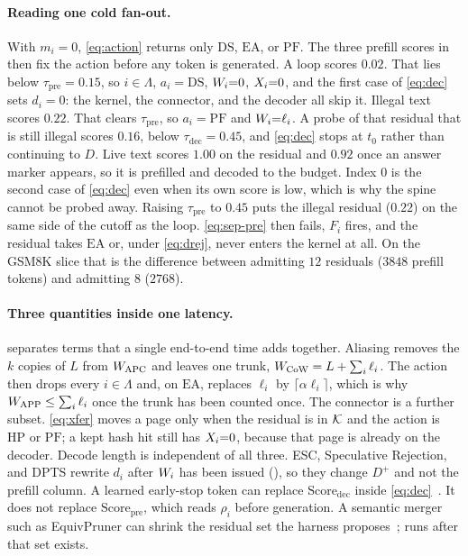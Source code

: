 \paragraph{Reading one cold fan-out.}
With $m_i{=}0$, \eqref{eq:action} returns only $\mathrm{DS}$, $\mathrm{EA}$, or $\mathrm{PF}$.
The three prefill scores in  then fix the action before any token is generated.
A loop scores $0.02$.
That lies below $\tau_{\mathrm{pre}}{=}0.15$, so $i{\in}\Lambda$, $a_i{=}\mathrm{DS}$, $W_i{=}0$, $X_i{=}0$, and the first case of \eqref{eq:dec} sets $d_i{=}0$: the kernel, the connector, and the decoder all skip it.
Illegal text scores $0.22$.
That clears $\tau_{\mathrm{pre}}$, so $a_i{=}\mathrm{PF}$ and $W_i{=}\ell_i$.
A probe of that residual that is still illegal scores $0.16$, below $\tau_{\mathrm{dec}}{=}0.45$, and \eqref{eq:dec} stops at $t_0$ rather than continuing to $D$.
Live text scores $1.00$ on the residual and $0.92$ once an answer marker appears, so it is prefilled and decoded to the budget.
Index $0$ is the second case of \eqref{eq:dec} even when its own score is low, which is why the spine cannot be probed away.
Raising $\tau_{\mathrm{pre}}$ to $0.45$ puts the illegal residual ($0.22$) on the same side of the cutoff as the loop.
\eqref{eq:sep-pre} then fails, $F_i$ fires, and the residual takes $\mathrm{EA}$ or, under \eqref{eq:drej}, never enters the kernel at all.
On the GSM8K slice that is the difference between admitting $12$ residuals ($3848$ prefill tokens) and admitting $8$ ($2768$).

\paragraph{Three quantities inside one latency.}
 separates terms that a single end-to-end time adds together.
Aliasing removes the $k$ copies of $L$ from $W_{\mathrm{APC}}$ and leaves one trunk, $W_{\mathrm{CoW}}=L+\sum_i\ell_i$.
The action then drops every $i{\in}\Lambda$ and, on $\mathrm{EA}$, replaces $\ell_i$ by $\lceil\alpha\ell_i\rceil$, which is why $W_{\mathrm{APP}}\le\sum_i\ell_i$ once the trunk has been counted once.
The connector is a further subset.
\eqref{eq:xfer} moves a page only when the residual is in $\mathcal{K}$ and the action is $\mathrm{HP}$ or $\mathrm{PF}$; a kept hash hit still has $X_i{=}0$, because that page is already on the decoder.
Decode length is independent of all three.
ESC, Speculative Rejection, and DPTS rewrite $d_i$ after $W_i$ has been issued (), so they change $D^{+}$ and not the prefill column.
A learned early-stop token can replace $\mathrm{Score}_{\mathrm{dec}}$ inside \eqref{eq:dec}~\cite{stoploss}.
It does not replace $\mathrm{Score}_{\mathrm{pre}}$, which reads $\rho_i$ before generation.
A semantic merger such as EquivPruner can shrink the residual set the harness proposes~\cite{equivpruner}; \sys runs after that set exists.

